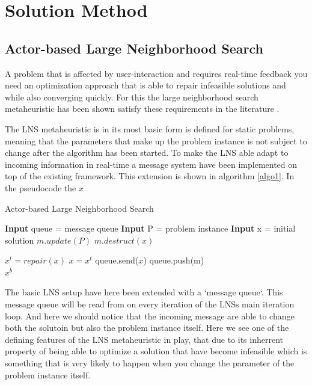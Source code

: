 \documentclass[preprint,12pt,authoryear]{elsarticle}
\begin{document}
\section{Solution Method}
\label{sec:2-solution-method}

\subsection{Actor-based Large Neighborhood Search}
A problem that is affected by user-interaction and requires real-time feedback you need an optimization approach that is able to repair infeasible solutions and while also 
converging quickly. For this the large neighborhood search metaheuristic has been shown satisfy these requirements in the literature \cite{gendreau_handbook_2019}. 

The LNS metaheuristic is in its most basic form is defined for static problems, meaning that the parameters that make up the problem instance is not subject to change 
after the algorithm has been started. To make the LNS able adapt to incoming information in real-time a message system have been implemented on top of the existing framework. This 
extension is shown in algorithm \ref{algo1}. In the pseudocode the $x$ 

\begin{algorithm}[H]
\caption{Actor-based Large Neighborhood Search}  \label{algo1}
\begin{algorithmic}[1]
\State \textbf{Input} queue = message queue
\State \textbf{Input} P     = problem instance
\State \textbf{Input} x     = initial solution
		\State $m.update(P)$
        \State $m.destruct(x)$
    \EndWhile
	
    \State $x^t = repair(x)$
                       \label{alg:objective_start}
        \State $x = x^t$
		\State queue.send($x$)
    \EndIf                                       \label{alg:objective_end}
	\State queue.push(m)
\EndWhile\\
\Return $x^b$
\end{algorithmic}
\end{algorithm}
The basic LNS setup have here been extended with a `message queue`. This message queue will be read from on every iteration of the LNSs main iteration loop. And here we should notice that the 
incoming message are able to change both the solutoin but also the problem instance itself. Here we see one of the defining features of the LNS metaheuristic in play, that due to its inherrent 
property of being able to optimize a solution that have become infeasible which is something that is very likely to happen when you change the parameter of the problem instance itself. 
\end{document}
